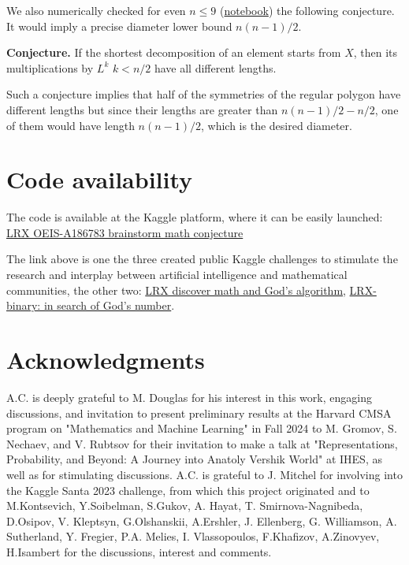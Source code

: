 \documentclass[atmp]{ipart_v1}
\numberwithin{equation}{section}
\theoremstyle{plain}%
\begin{document}
We also numerically checked for even  $n \le 9$ (\href{https://www.kaggle.com/code/fedmug/lrx-shifts-starting-with-x}{notebook}) the following conjecture. It would imply a precise diameter lower bound $n(n-1)/2$. 

{\bf Conjecture.} If the shortest  decomposition of an element starts from $X$, then its multiplications by $L^k$ $k<n/2$  have all different lengths.  

Such a conjecture implies that half of the symmetries of the regular polygon have different lengths but since their lengths are greater than $n(n-1)/2-n/2$, one of them would have length $n(n-1)/2$, which is the desired diameter. 

\section{Code availability}

The code is available at the Kaggle platform, where it can be easily launched:
\href{https://www.kaggle.com/competitions/lrx-oeis-a-186783-brainstorm-math-conjecture/code}{LRX OEIS-A186783 brainstorm math conjecture}

The link above is one  the three  created public Kaggle challenges to stimulate the research and interplay between artificial intelligence and mathematical communities, the other two:
\href{https://www.kaggle.com/competitions/lrx-binary-in-search-of-gods-number}{LRX discover math and God's algorithm}, \href{https://www.kaggle.com/competitions/lrx-discover-math-gods-algorithm}{LRX-binary: in search of God's number}.


\section{Acknowledgments}
A.C. is deeply grateful to M. Douglas for his interest in this work, engaging discussions, and invitation to present preliminary results at the Harvard CMSA program on "Mathematics and Machine Learning" in Fall 2024 to M. Gromov, S. Nechaev, and V. Rubtsov for their invitation to make a talk at "Representations, Probability, and Beyond: A Journey into Anatoly Vershik World" at IHES, as well as for stimulating discussions. A.C. is grateful to J. Mitchel for involving  into the Kaggle Santa 2023 challenge, from which this project originated and to M.Kontsevich, Y.Soibelman,  S.Gukov, A. Hayat, T. Smirnova-Nagnibeda,  D.Osipov, V. Kleptsyn, G.Olshanskii, A.Ershler, J. Ellenberg, G. Williamson, A. Sutherland,  Y. Fregier, P.A. Melies, I. Vlassopoulos, F.Khafizov, A.Zinovyev,  H.Isambert for the discussions, interest and comments. 
\end{document}
